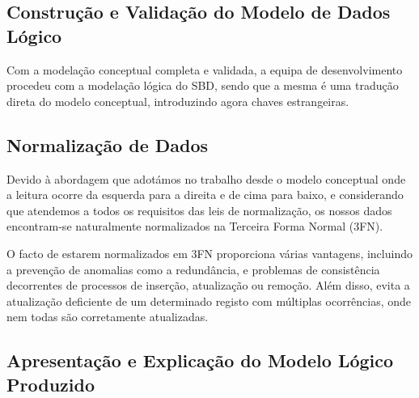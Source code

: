 \documentclass[a4paper,12pt]{scrreprt}
\begin{document}
\subsection{Construção e Validação do Modelo de Dados Lógico}
Com a modelação conceptual completa e validada, a equipa de desenvolvimento procedeu com a modelação
lógica do SBD, sendo que a mesma é uma tradução direta do modelo conceptual, introduzindo agora chaves estrangeiras.

\subsection{Normalização de Dados}

Devido à abordagem que adotámos no trabalho desde o modelo conceptual onde a leitura ocorre da esquerda para a direita e de cima para baixo, e considerando que atendemos a todos os requisitos das leis de normalização, os nossos dados encontram-se naturalmente normalizados na Terceira Forma Normal (3FN).

O facto de estarem normalizados em 3FN proporciona várias vantagens, incluindo a prevenção de anomalias como a redundância, 
e problemas de consistência decorrentes de processos de inserção, atualização ou remoção. 
Além disso, evita a atualização deficiente de um determinado registo com múltiplas ocorrências, onde nem todas são corretamente atualizadas.

\subsection{Apresentação e Explicação do Modelo Lógico Produzido}
\end{document}

